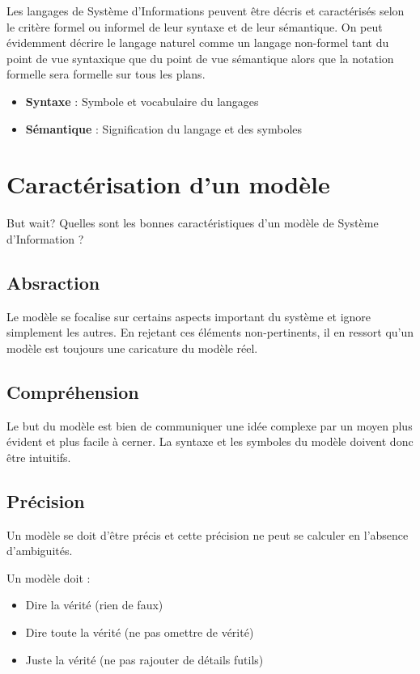 Les langages de Système d'Informations peuvent être décris et caractérisés selon le critère formel ou informel de leur syntaxe et de leur sémantique. On peut évidemment décrire le langage naturel comme un langage non-formel tant du point de vue syntaxique que du point de vue sémantique alors que la notation formelle sera formelle sur tous les plans.

\begin{itemize}
  \item \textbf{Syntaxe} : Symbole et vocabulaire du langages
  \item \textbf{Sémantique} : Signification du langage et des symboles
\end{itemize}

\section{Caractérisation d'un modèle}

But wait? Quelles sont les bonnes caractéristiques d'un modèle de Système d'Information ?

\subsection{Absraction}

Le modèle se focalise sur certains aspects important du système et ignore simplement les autres. En rejetant ces éléments non-pertinents, il en ressort qu'un modèle est toujours une caricature du modèle réel.

\subsection{Compréhension}

Le but du modèle est bien de communiquer une idée complexe par un moyen plus évident et plus facile à cerner. La syntaxe et les symboles du modèle doivent donc être intuitifs.

\subsection{Précision}

Un modèle se doit d'être précis et cette précision ne peut se calculer en l'absence d'ambiguités.

Un modèle doit :

\begin{itemize}
  \item Dire la vérité (rien de faux)
  \item Dire toute la vérité (ne pas omettre de vérité)
  \item Juste la vérité (ne pas rajouter de détails futils)
\end{itemize}

